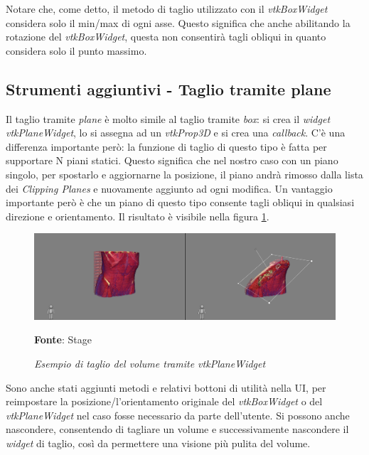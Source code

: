 Notare che, come detto, il metodo di taglio utilizzato con il \emph{vtkBoxWidget} considera solo il min/max di ogni asse. Questo significa che anche abilitando la rotazione del \emph{vtkBoxWidget}, questa non consentirà tagli obliqui in quanto considera solo il punto massimo. 

\subsection{Strumenti aggiuntivi - Taglio tramite plane}
Il taglio tramite \emph{plane} è molto simile al taglio tramite \emph{box}: si crea il \emph{widget vtkPlaneWidget}, lo si assegna ad un \emph{vtkProp3D} e si crea una \emph{callback}. C'è una differenza importante però: la funzione di taglio di questo tipo è fatta per supportare N piani statici. Questo significa che nel nostro caso con un piano singolo, per spostarlo e aggiornarne la posizione, il piano andrà rimosso dalla lista dei \emph{Clipping Planes} e nuovamente aggiunto ad ogni modifica. Un vantaggio importante però è che un piano di questo tipo consente tagli obliqui in qualsiasi direzione e orientamento. Il risultato è visibile nella figura \ref{fig: Taglio Plane}.

\begin{figure}[h]
    \centering
    \includegraphics[width=1\textwidth]{immagini/svolgimento/planecrop.png}
    \caption{\textit{Esempio di taglio del volume tramite vtkPlaneWidget}}
    \textbf{Fonte}: Stage
    \label{fig: Taglio Plane}
\end{figure}

Sono anche stati aggiunti metodi e relativi bottoni di utilità nella UI, per reimpostare la posizione/l'orientamento originale del \emph{vtkBoxWidget} o del \emph{vtkPlaneWidget} nel caso fosse necessario da parte dell'utente. Si possono anche nascondere, consentendo di tagliare un volume e successivamente nascondere il \emph{widget} di taglio, così da permettere una visione più pulita del volume.

